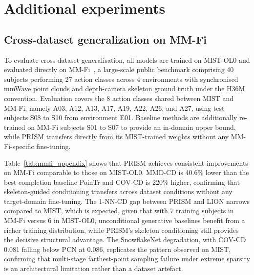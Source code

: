 \documentclass{article}
\begin{document}
\section{Additional experiments}
\label{app:additional}

\subsection{Cross-dataset generalization on MM-Fi}
\label{app:mmfi_results}

To evaluate cross-dataset generalisation, all models are trained on MIST-OL0 and
evaluated directly on MM-Fi~\cite{yang2023mm}, a large-scale public benchmark
comprising 40 subjects performing 27 action classes across 4 environments with
synchronised mmWave point clouds and depth-camera skeleton ground truth under the
H36M convention.
Evaluation covers the 8 action classes shared between MIST and MM-Fi, namely A03,
A12, A13, A17, A19, A22, A26, and A27, using test subjects S08 to S10 from
environment E01.
Baseline methods are additionally re-trained on MM-Fi subjects S01 to S07 to
provide an in-domain upper bound, while PRISM transfers directly from its MIST-trained
weights without any MM-Fi-specific fine-tuning.

Table~\ref{tab:mmfi_appendix} shows that PRISM achieves consistent improvements
on MM-Fi comparable to those on MIST-OL0.
MMD-CD is 40.6\% lower than the best completion baseline PoinTr and COV-CD is
220\% higher, confirming that skeleton-guided conditioning transfers across dataset
conditions without any target-domain fine-tuning.
The 1-NN-CD gap between PRISM and LION narrows compared to MIST, which is expected, given that with 7 training subjects in MM-Fi versus 6 in MIST-OL0, unconditional generative
baselines benefit from a richer training distribution, while PRISM's skeleton conditioning
still provides the decisive structural advantage.
The SnowflakeNet degradation, with COV-CD 0.081 falling below PCN at 0.086,
replicates the pattern observed on MIST, confirming that multi-stage farthest-point
sampling failure under extreme sparsity is an architectural limitation rather than a
dataset artefact.
\end{document}

